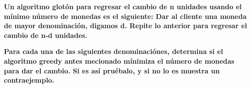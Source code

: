 \textbf{
    Un algoritmo glotón para regresar el cambio
    de n unidades usando el mínimo número de 
    monedas es el siguiente: Dar al cliente una
    moneda de mayor denominación, digamos d.
    Repite lo anterior para regresar el cambio 
    de n-d unidades.
}
\vspace{.3cm}

\textbf{
    Para cada una de las siguientes denominaciónes,
    determina si el algoritmo greedy antes mecionado
    mínimiza el número de monedas para dar el cambio.
    Si es así pruébalo, y si no lo es muestra un 
    contraejemplo.
}\vspace{.2cm}